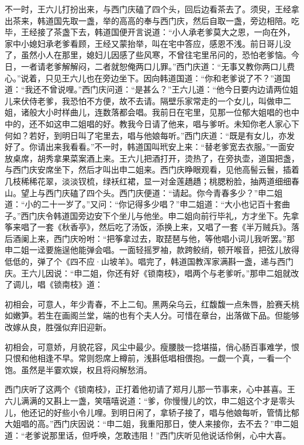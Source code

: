 不一时，王六儿打扮出来，与西门庆磕了四个头，回后边看茶去了。须臾，王经拿出茶来，韩道国先取一盏，举的高高的奉与西门庆，然后自取一盏，旁边相陪。吃毕，王经接了茶盏下去，韩道国便开言说道：“小人承老爹莫大之恩，一向在外，家中小媳妇承老爹看顾，王经又蒙抬举，叫在宅中答应，感恩不浅。前日哥儿没了，虽然小人在那里，媳妇儿因感了些风寒，不曾往宅里吊问的，恐怕老爹恼。今日，一者请老爹解解闷，二者就恕俺两口儿罪。”西门庆道：“无事又教你两口儿费心。”说着，只见王六儿也在旁边坐下。因向韩道国道：“你和老爹说了不？”道国道：“我还不曾说哩。”西门庆问道：“是甚么？”王六儿道：“他今日要内边请两位姐儿来伏侍老爹，我恐怕不方便，故不去请。隔壁乐家常走的一个女儿，叫做申二姐，诸般大小时样曲儿，连数落都会唱。我前日在宅里，见那一位郁大姐唱的也中中的，还不如这申二姐唱的好。教我今日请了他来，唱与爹听。未知你老人家心下何如？若好，到明日叫了宅里去，唱与他娘每听。”西门庆道：“既是有女儿，亦发好了。你请出来我看看。”不一时，韩道国叫玳安上来：“替老爹宽去衣服。”一面安放桌席，胡秀拿果菜案酒上来。王六儿把酒打开，烫热了，在旁执壶，道国把盏，与西门庆安席坐下，然后才叫出申二姐来。西门庆睁眼观看，见他高髻云鬟，插着几枝稀稀花翠，淡淡钗梳，绿袄红裙，显一对金莲趫趫；桃腮粉脸，抽两道细细春山。望上与西门庆磕了四个头。西门庆便道：“请起。你今青春多少？”申二姐道：“小的二十一岁了。”又问：“你记得多少唱？”申二姐道：“大小也记百十套曲子。”西门庆令韩道国旁边安下个坐儿与他坐。申二姐向前行毕礼，方才坐下。先拿筝来唱了一套《秋香亭》，然后吃了汤饭，添换上来，又唱了一套《半万贼兵》。落后酒阑上来，西门庆吩咐：“把筝拿过去，取琵琶与他，等他唱小词儿我听罢。”那申二姐一迳要施逞他能弹会唱。一面轻摇罗袖，款跨鲛绡，顿开喉音，把弦儿放得低低的，弹了个《四不应·山坡羊》。唱完了，韩道国教浑家满斟一盏，递与西门庆。王六儿因说：“申二姐，你还有好《锁南枝》，唱两个与老爹听。”那申二姐就改了调儿，唱《锁南枝》道：

初相会，可意人，年少青春，不上二旬。黑\textSiCan \textSiCan 两朵乌云，红馥馥一点朱唇，脸赛夭桃如嫩笋。若生在画阁兰堂，端的也有个夫人分。可惜在章台，出落做下品。但能够改嫁从良，胜强似弃旧迎新。

初相会，可意娇，月貌花容，风尘中最少。瘦腰肢一捻堪描，俏心肠百事难学，恨只恨和他相逢不早。常则怨席上樽前，浅斟低唱相偎抱。一觑一个真，一看一个饱。虽然是半霎欢娱，权且将闷解愁消。

西门庆听了这两个《锁南枝》，正打着他初请了郑月儿那一节事来，心中甚喜。王六儿满满的又斟上一盏，笑嘻嘻说道：“爹，你慢慢儿的饮，申二姐这个才是零头儿，他还记的好些小令儿哩。到明日闲了，拿轿子接了，唱与他娘每听，管情比郁大姐唱的高。”西门庆因说：“申二姐，我重阳那日，使人来接你，去不去？”申二姐道：“老爹说那里话，但呼唤，怎敢违阻！”西门庆听见他说话伶俐，心中大喜。

